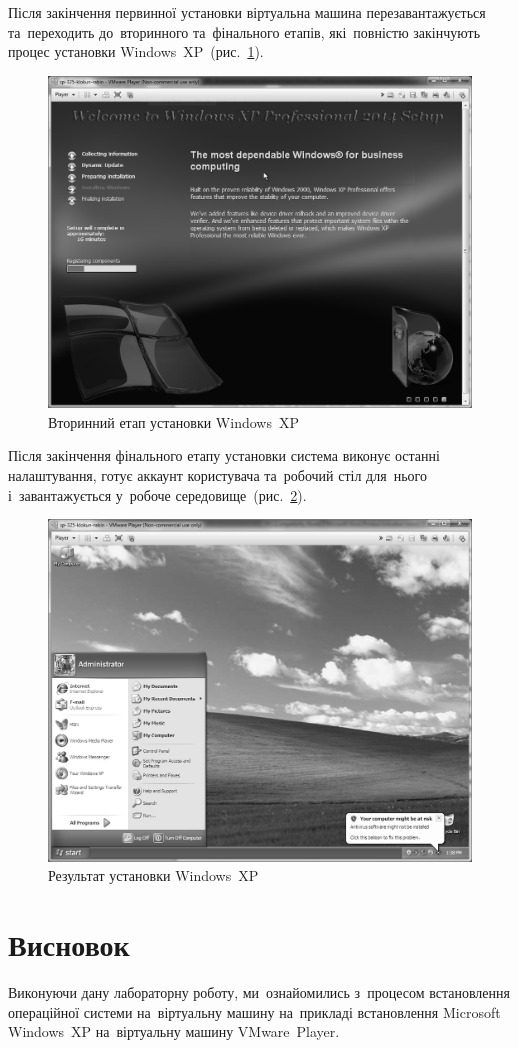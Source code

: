 \documentclass[
	a4paper,
	oneside,
	DIV = 12,
	fontsize = 13pt,
	headings = normal,
]{scrartcl}
\begin{document}
		Після закінчення первинної установки віртуальна машина перезавантажується та~переходить до~вторинного та~фінального етапів, які~повністю закінчують процес установки Windows~XP~(рис.~\ref{fig:02-winxp-install-secondary}).
		\begin{figure}[!htb]
			\centering
			\includegraphics[height = 10\baselineskip]{./assets/y03s01-pcdiag-lab-01-02-bw.png}
			\caption{Вторинний етап установки Windows~XP}
			\label{fig:02-winxp-install-secondary}
		\end{figure}

		Після закінчення фінального етапу установки система виконує останні налаштування, готує аккаунт користувача та~робочий стіл для~нього і~завантажується у~робоче середовище~(рис.~\ref{fig:03-winxp-install-desktop}).
		\begin{figure}[!htb]
			\centering
			\includegraphics[height = 10\baselineskip]{./assets/y03s01-pcdiag-lab-01-03-bw.png}
			\caption{Результат установки Windows~XP}
			\label{fig:03-winxp-install-desktop}
		\end{figure}

	\section{Висновок}
		Виконуючи дану лабораторну роботу, ми~ознайомились з~процесом встановлення операційної системи на~віртуальну машину на~прикладі встановлення Microsoft Windows~XP на~віртуальну машину VMware~Player.
\end{document}

